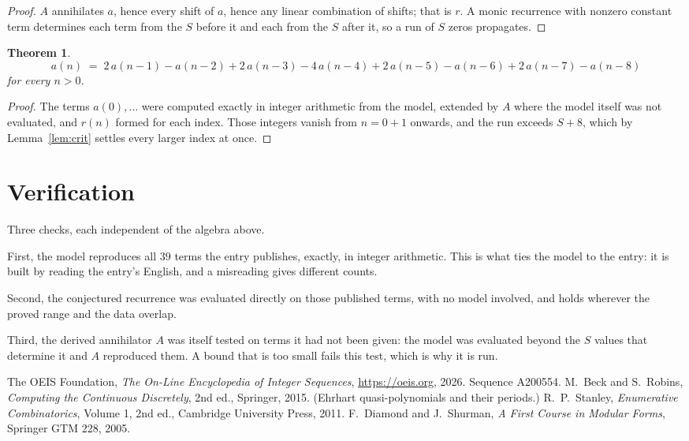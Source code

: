 \documentclass[11pt,a4paper]{article}
\theoremstyle{plain}
\newtheorem{theorem}{Theorem}
\theoremstyle{definition}
\begin{document}
\begin{proof}
$A$ annihilates $a$, hence every shift of $a$, hence any linear combination of shifts; that is
$r$. A monic recurrence with nonzero constant term determines each term from the $S$ before it
and each from the $S$ after it, so a run of $S$ zeros propagates.
\end{proof}

\begin{theorem}
\[
a(n)\;=\;2\,a(n-1) - a(n-2) + 2\,a(n-3) - 4\,a(n-4) + 2\,a(n-5) - a(n-6) + 2\,a(n-7) - a(n-8)
\]
for every $n>0$.
\end{theorem}

\begin{proof}
The terms $a(0),\dots$ were computed exactly in integer arithmetic from the model, extended by
$A$ where the model itself was not evaluated, and $r(n)$ formed for each index. Those integers
vanish from $n=0+1$ onwards, and the run exceeds $S+8$, which by
Lemma~\ref{lem:crit} settles every larger index at once.
\end{proof}

\section{Verification}

Three checks, each independent of the algebra above.

First, the model reproduces all $39$ terms the entry publishes, exactly, in integer
arithmetic. This is what ties the model to the entry: it is built by reading the entry's
English, and a misreading gives different counts.

Second, the conjectured recurrence was evaluated directly on those published terms, with no
model involved, and holds wherever the proved range and the data overlap.

Third, the derived annihilator $A$ was itself tested on terms it had not been given: the model
was evaluated beyond the $S$ values that determine it and $A$ reproduced them. A bound that is
too small fails this test, which is why it is run.

\begin{thebibliography}{9}
 The OEIS Foundation, \emph{The On-Line Encyclopedia of Integer
Sequences}, \url{https://oeis.org}, 2026. Sequence A200554.
 M.~Beck and S.~Robins, \emph{Computing the Continuous Discretely},
2nd ed., Springer, 2015. (Ehrhart quasi-polynomials and their periods.)
 R.~P.~Stanley, \emph{Enumerative Combinatorics}, Volume 1, 2nd ed.,
Cambridge University Press, 2011.
 F.~Diamond and J.~Shurman, \emph{A First Course in Modular Forms},
Springer GTM 228, 2005.
\end{thebibliography}
\end{document}
